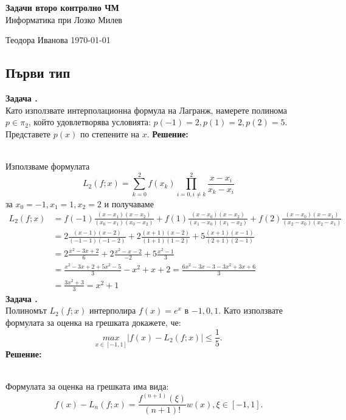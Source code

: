 \documentclass[12pt]{article}
\newcounter{problem}
\newcounter{solution}
\newcommand\problem{%
  \stepcounter{problem}%
  \textbf{Задача \theproblem.}~%
  \\
}
\newcommand\solution{%
  \textbf{Решение:}\\~%
}
\begin{document}
\begin{titlepage}
\begin{center}
    \vspace{5em}
    \textbf{\Huge{Задачи второ контролно ЧМ}}\\
    \vspace{2em}
    \LARGE{Информатика при Лозко Милев}
\end{center}
\vfill

Теодора Иванова \hfill \today
\end{titlepage}
\begin{center}{\section*{Първи тип}}\end{center}
    \problem
        Като използвате интерполационна формула на Лагранж, намерете полинома $p\in\pi_2$, който удовлетворява условията: $p(-1) = 2, p(1)  = 2, p(2) = 5$. Представете $p(x)$ по степените на $x$.
    \solution
        Използваме формулата
        \begin{equation*}
        L_2(f;x) = \sum_{k=0}^{2}f(x_k)\prod_{i=0,i\neq k}^{2}\frac{x-x_i}{x_k-x_i}
        \end{equation*}
        за $x_0=-1, x_1 = 1, x_2 = 2$
        и получаваме
        \begin{align*}
        L_2(f;x) &= f(-1)\frac{(x-x_1)(x-x_2)}{(x_0-x_1)(x_0-x_2)}+f(1)\frac{(x-x_0)(x-x_2)}{(x_1-x_0)(x_1-x_2)}+f(2)\frac{(x-x_0)(x-x_1)}{(x_2-x_0)(x_2-x_1)}\\
        &=2\frac{(x-1)(x-2)}{(-1-1)(-1-2)}+2\frac{(x+1)(x-2)}{(1+1)(1-2)}+5\frac{(x+1)(x-1)}{(2+1)(2-1)}\\
        &=2\frac{x^2-3x+2}{6}+2\frac{x^2-x-2}{-2}+5\frac{x^2-1}{3}\\
        &=\frac{x^2-3x+2+5x^2-5}{3} - x^2+x+2 = \frac{6x^2-3x-3-3x^2+3x+6}{3}\\
        &=\frac{3x^2+3}{3} = \boxed{x^2+1}
        \end{align*}
    \problem
        Полиномът $L_2(f;x)$ интерполира $f(x)= e^x$ в $-1, 0, 1$. Като използвате формулата за оценка на грешката докажете, че:
        \begin{equation*}
        \underset{x\in[-1,1]}{max}|f(x)-L_2(f;x)|\leq \frac{1}{5}.
        \end{equation*}
    \solution
        Формулата за оценка на грешката има вида:
        \begin{equation*}
        f(x)-L_n(f;x) = \frac{f^{(n+1)}(\xi)}{(n+1)!}w(x), \xi\in[-1,1].
        \end{equation*}
\end{document}
